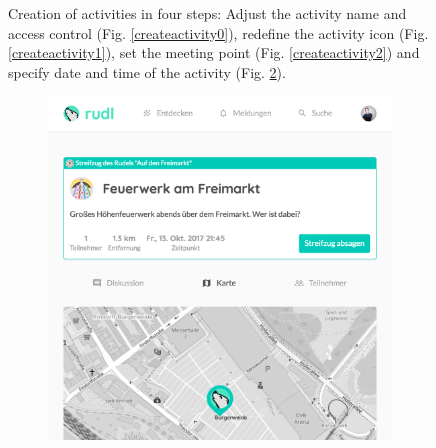 \documentclass[12pt,numbers=noenddot,parskip,bibliography=totocnumbered,listof=totocnumbered,draft]{scrreprt}
\begin{document}
\begin{figure}
\begin{subfigure}[t]{0.45\textwidth}
\caption{}
\label{createactivity3}
\end{subfigure}%
\caption[Creation of activities]{Creation of activities in four steps: Adjust the activity name and access control (Fig. \ref{createactivity0}), redefine the activity icon (Fig. \ref{createactivity1}), set the meeting point (Fig. \ref{createactivity2}) and specify date and time of the activity (Fig. \ref{createactivity3}).}
\end{figure}

\begin{figure}
\begin{subfigure}[t]{0.45\textwidth}%
\centering
\includegraphics[width=\linewidth]{activity.png}
\caption{}
\label{activity}
\end{subfigure}%
\hfill
\begin{subfigure}[t]{0.45\textwidth}%
\centering

\end{subfigure}
\end{figure}
\end{document}
